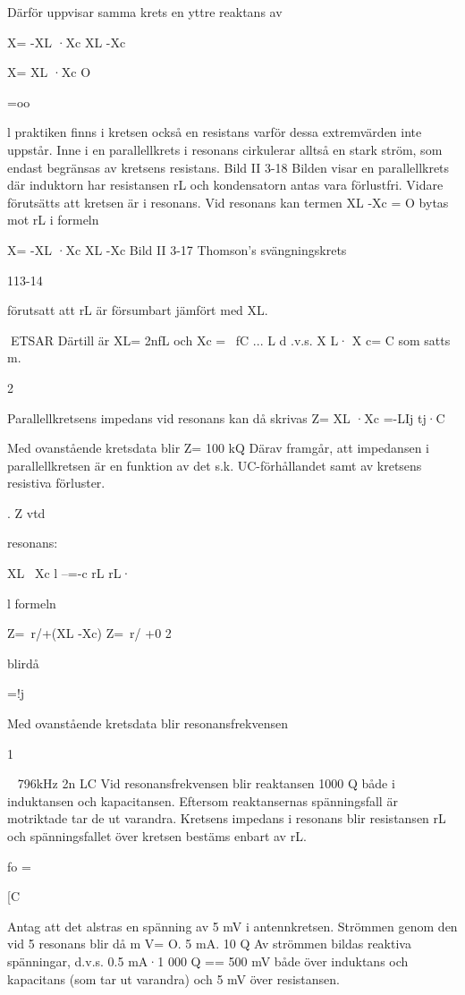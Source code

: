 \documentclass[a4paper,twoside,twocolumn,openright]{book}
\begin{document}
{{{{{Därför uppvisar samma krets en yttre
reaktans av

X= -XL ·Xc
XL -Xc

X= XL ·Xc
O

=oo

l praktiken finns i kretsen också en
resistans varför dessa extremvärden inte
uppstår. Inne i en parallellkrets i resonans cirkulerar alltså en stark ström, som
endast begränsas av kretsens resistans.
Bild II 3-18
Bilden visar en parallellkrets där
induktorn har resistansen rL och kondensatorn antas vara förlustfri. Vidare
förutsätts att kretsen är i resonans.
Vid resonans kan termen XL -Xc = O
bytas mot rL i formeln

X= -XL ·Xc
XL -Xc
Bild II 3-17 Thomson's svängningskrets

113-14

förutsatt att rL är försumbart jämfört med
XL.

ETSAR
Därtill är XL= 2nfL och Xc = ~fC
...
L
d .v.s. X L· X c= C som satts m.

2

Parallellkretsens impedans vid resonans kan
då skrivas
Z= XL ·Xc =-LIj
tj·C

Med ovanstående kretsdata blir Z= 100 kQ
Därav framgår, att impedansen i parallellkretsen är en funktion av det s.k. UC-förhållandet samt av kretsens resistiva förluster.

.
Z vtd

resonans:

XL~ Xc
l
--=-c
rL
rL·

l formeln

Z=~r/+(XL -Xc)
Z=~r/ +0 2

blirdå

=!j

Med ovanstående kretsdata blir resonansfrekvensen

1

~ 796kHz
2n LC
Vid resonansfrekvensen blir reaktansen
1000 Q både i induktansen och kapacitansen. Eftersom reaktansernas spänningsfall
är motriktade tar de ut varandra. Kretsens
impedans i resonans blir resistansen rL och
spänningsfallet över kretsen bestäms enbart av rL.

fo =

{[C

Antag att det alstras en spänning av 5 mV
i antennkretsen. Strömmen genom den vid
5
resonans blir då
m V= O. 5 mA.
10 Q
Av strömmen bildas reaktiva spänningar,
d.v.s. 0.5 mA·1 000 Q == 500 mV både över
induktans och kapacitans (som tar ut varandra) och 5 mV över resistansen.

}}}}}}
\end{document}
